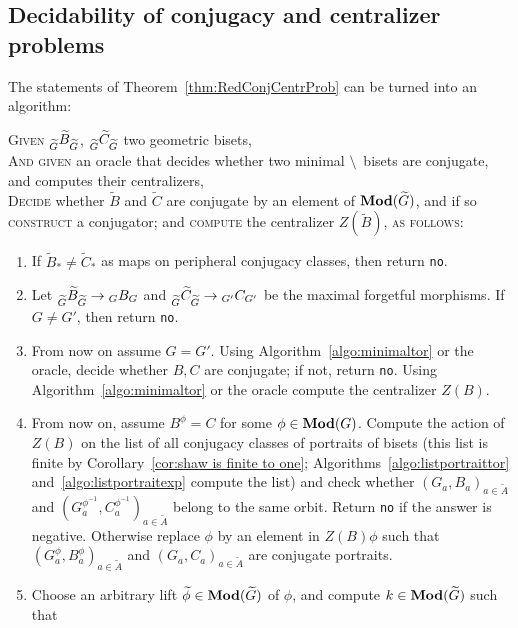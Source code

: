 \documentclass{amsart}
\newcommand\wtA{{\widetilde A}}
\newcommand\wtB{{\widetilde B}}
\newcommand\wtC{{\widetilde C}}
\newcommand\wtG{{\widetilde G}}
\begin{document}
\subsection{Decidability of conjugacy and centralizer problems}\label{ss:decidability}
The statements of Theorem~\ref{thm:RedConjCentrProb} can be turned
into an algorithm:
\begin{algo}\label{algo:red}
  \textsc{Given} $\subscript{\wtG}{\wtB}_{\wtG}$, $\subscript{\wtG}{\wtC}_{\wtG}$ two geometric bisets,\\
  \textsc{And given} an oracle that decides whether two minimal \Exp$\setminus$\Tor\ bisets are conjugate, and computes their centralizers,\\
  \textsc{Decide} whether $\wtB$ and $\wtC$ are conjugate by an element of $\Mod(\wtG)$, and if so \textsc{construct} a conjugator; and   \textsc{compute} the centralizer $Z(\wtB)$, \textsc{as follows:}\\\upshape
  \begin{enumerate}
  \item If $\wtB_*\neq \wtC_*$ as maps on peripheral
    conjugacy classes, then return \texttt{no}.
  \item Let
    $\subscript{\wtG}{\wtB}_{\wtG}\to
    \subscript G B_G$ and
    $\subscript{\wtG}{\wtC}_{\wtG}\to
    \subscript{G'}C_{G'}$ be the maximal forgetful morphisms. If
    $G\neq G'$, then return \texttt{no}.
  \item From now on assume $G=G'$. Using
    Algorithm~\ref{algo:minimaltor} or the oracle, decide whether
    $B,C$ are conjugate; if not, return \texttt{no}. Using
    Algorithm~\ref{algo:minimaltor} or the oracle compute the
    centralizer $Z(B)$.
  \item From now on, assume $B^\phi=C$ for some
    $\phi\in\mathbf{\relax Mod}(G)$. Compute the action of $Z(B)$ on the list of all
    conjugacy classes of portraits of bisets (this list is finite by
    Corollary~\ref{cor:shaw is finite to one};
    Algorithms~\ref{algo:listportraittor}
    and~\ref{algo:listportraitexp} compute the list) and check whether
    $(G_a,B_a)_{a\in \wtA}$ and
    $(G^{\phi^{-1}}_a,C^{\phi^{-1}}_a)_{a\in \wtA}$ belong to
    the same orbit. Return \texttt{no} if the answer is
    negative. Otherwise replace $\phi$ by an element in $Z(B)\phi$
    such that $(G^\phi_a,B^\phi_a)_{a\in \wtA}$ and
    $(G_a,C_a)_{a\in \wtA}$ are conjugate portraits.
  \item Choose an arbitrary lift $\widetilde\phi\in\Mod(\wtG)$
    of $\phi$, and compute $k\in\Mod(\wtG)$ such that

\end{enumerate}
\end{algo}
\end{document}
